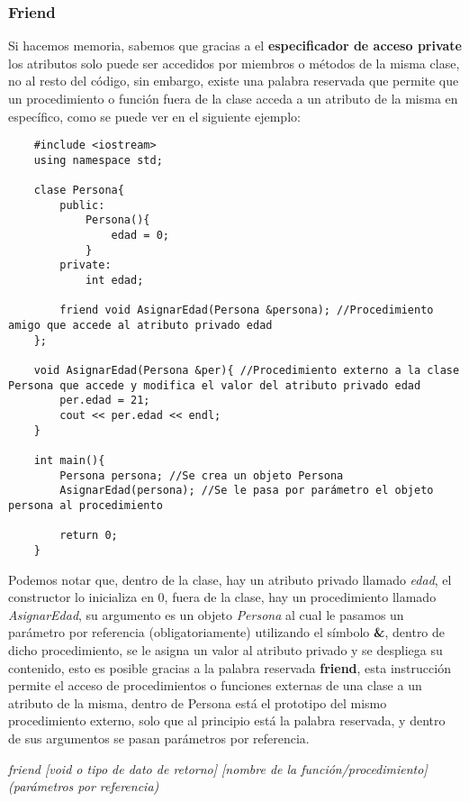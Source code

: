 \subsubsection{Friend}
\hspace{0.55cm}Si hacemos memoria, sabemos que gracias a el \textbf{especificador de acceso private} los atributos solo puede ser accedidos por miembros o métodos de la misma clase, no al resto del código, sin embargo, existe una palabra reservada que permite que un procedimiento o función fuera de la clase acceda a un atributo de la misma en específico, como se puede ver en el siguiente ejemplo:
\begin{lstlisting}
    #include <iostream>
    using namespace std;

    clase Persona{
        public:
            Persona(){
                edad = 0;
            }
        private:
            int edad;
        
        friend void AsignarEdad(Persona &persona); //Procedimiento amigo que accede al atributo privado edad
    };
    
    void AsignarEdad(Persona &per){ //Procedimiento externo a la clase Persona que accede y modifica el valor del atributo privado edad
        per.edad = 21;
        cout << per.edad << endl;
    }
    
    int main(){
        Persona persona; //Se crea un objeto Persona
        AsignarEdad(persona); //Se le pasa por parámetro el objeto persona al procedimiento
        
        return 0;
    }
\end{lstlisting}

Podemos notar que, dentro de la clase, hay un atributo privado llamado \textit{edad}, el constructor lo inicializa en 0, fuera de la clase, hay un procedimiento llamado \textit{AsignarEdad}, su argumento es un objeto \textit{Persona} al cual le pasamos un parámetro por referencia (obligatoriamente) utilizando el símbolo \textbf{\&}, dentro de dicho procedimiento, se le asigna un valor al atributo privado y se despliega su contenido, esto es posible gracias a la palabra reservada \textbf{friend}, esta instrucción permite el acceso de procedimientos o funciones externas de una clase a un atributo de la misma, dentro de Persona está el prototipo del mismo procedimiento externo, solo que al principio está la palabra reservada, y dentro de sus argumentos se pasan parámetros por referencia.
\begin{center}
    \textit{friend [void o tipo de dato de retorno] [nombre de la función/procedimiento] (parámetros por referencia)}
\end{center}

